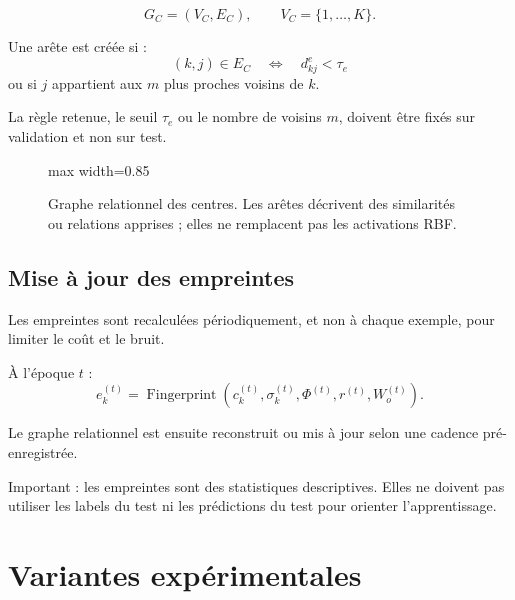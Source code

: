 \documentclass[11pt,a4paper]{article}
\begin{document}
\[
G_C=(V_C,E_C),\qquad
V_C=\{1,\ldots,K\}.
\]

Une arête est créée si :
\[
(k,j)\in E_C
\quad\Longleftrightarrow\quad
d_{kj}^{e}<\tau_e
\]
ou si \(j\) appartient aux \(m\) plus proches voisins de \(k\).

La règle retenue, le seuil \(\tau_e\) ou le nombre de voisins \(m\),
doivent être fixés sur validation et non sur test.

\begin{figure}[H]
\centering
\begin{adjustbox}{max width=0.85\linewidth}
\end{adjustbox}
\caption{Graphe relationnel des centres. Les arêtes décrivent des
similarités ou relations apprises ; elles ne remplacent pas les
activations RBF.}
\end{figure}

\subsection{Mise à jour des empreintes}

Les empreintes sont recalculées périodiquement, et non à chaque exemple,
pour limiter le coût et le bruit.

À l'époque \(t\) :
\[
e_k^{(t)}=\operatorname{Fingerprint}(c_k^{(t)},\sigma_k^{(t)},
\Phi^{(t)},r^{(t)},W_o^{(t)}).
\]

Le graphe relationnel est ensuite reconstruit ou mis à jour selon
une cadence pré-enregistrée.

Important : les empreintes sont des statistiques descriptives.
Elles ne doivent pas utiliser les labels du test ni les prédictions
du test pour orienter l'apprentissage.

\section{Variantes expérimentales}
\end{document}

